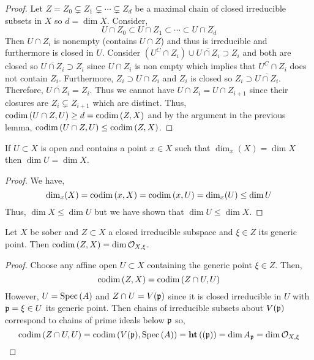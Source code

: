 \documentclass[12pt]{article}
\begin{document}
\begin{proof}
Let $Z = Z_0 \subsetneq Z_1 \subsetneq \cdots \subsetneq Z_d$ be a maximal chain of closed irreducible subsets in $X$ so $d = \dim{X}$. Consider,
\[ U \cap Z_0 \subset U \cap Z_1 \subset \cdots \subset U \cap Z_d \]
Then $U \cap Z_i$ is nonempty (contains $U \cap Z$) and thus is irreducible and furthermore is closed in $U$. Consider $(U^C \cap Z_i) \cup \overline{U \cap Z_i} \supset Z_i$ and both are closed so $\overline{U \cap Z_i} \supset Z_i$ since $U \cap Z_i$ is non empty which implies that $U^C \cap Z_i$ does not contain $Z_i$. Furthermore, $Z_i \supset U \cap Z_i$ and $Z_i$ is closed so $Z_i \supset \overline{U \cap Z_i}$. Therefore, $\overline{U \cap Z_i} = Z_i$. Thus we cannot have $U \cap Z_{i} = U \cap Z_{i+1}$ since their closures are $Z_i \subsetneq Z_{i+1}$ which are distinct. Thus, $\mathrm{codim}\left( U \cap Z, U \right) \ge d = \mathrm{codim}\left( Z, X \right)$ and by the argument in the previous lemma, $\mathrm{codim}\left( U \cap Z, U \right) \le \mathrm{codim}\left( Z, X \right)$.
\end{proof}

\begin{corollary}
If $U \subset X$ is open and contains a point $x \in X$ such that $\dim_x(X) = \dim{X}$ then $\dim{U} = \dim{X}$.
\end{corollary}

\begin{proof}
We have, \[ \dim_x(X) = \mathrm{codim}\left( x, X \right) = \mathrm{codim}\left( x, U \right) = \dim_x(U) \le \dim{U} \]
Thus, $\dim{X} \le \dim{U}$ but we have shown that $\dim{U} \le \dim{X}$.
\end{proof}

\begin{lemma}
Let $X$ be sober and $Z \subset X$ a closed irreducible subspace and $\xi \in Z$ its generic point. Then $\mathrm{codim}\left( Z, X \right) = \dim{\mathcal{O}_{X, \xi}}$.
\end{lemma}

\begin{proof}
Choose any affine open $U \subset X$ containing the generic point $\xi \in Z$. Then,
\[ \mathrm{codim}\left( Z, X \right) = \mathrm{codim}\left( Z \cap U, U \right) \]
However, $U = \mathrm{Spec}\left( A \right)$ and $Z \cap U = V(\mathfrak{p})$ since it is closed irreducible in $U$ with $\mathfrak{p} = \xi \in U$ its generic point. Then chains of irreducible subsets about $V(\mathfrak{p})$ correspond to chains of prime ideals below $\mathfrak{p}$ so,
\[ \mathrm{codim}\left( Z \cap U, U \right) = \mathrm{codim}\left( V(\mathfrak{p}), \mathrm{Spec}\left( A \right) \right) = \mathbf{ht}\left( (\mathfrak{p}) \right) = \dim{A_{\mathfrak{p}}} = \dim{\mathcal{O}_{X, \xi}} \]
\end{proof}
\end{document}
